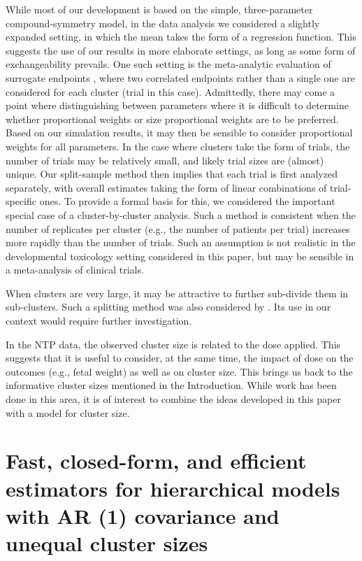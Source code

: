 \documentclass[11pt,a5paper,twoside]{book}
\begin{document}
While most of our development is based on the simple, three-parameter 
compound-symmetry model, in the data analysis we considered a slightly 
expanded setting, in which the mean takes the form of a regression 
function. This suggests the 
use of our results in more elaborate settings, as long as some 
form of exchangeability prevails. One such setting is the meta-analytic 
evaluation of surrogate endpoints \citep{burzykowski2006}, where two correlated 
endpoints rather than a single one are considered for each cluster 
(trial in this case). Admittedly, there may come a point where 
distinguishing between parameters where it is difficult to determine whether proportional weights or 
size proportional weights are to be preferred. Based on our simulation results, it may 
then be sensible to consider proportional weights for all parameters. 
In the case where clusters take the form of trials, the number of 
trials may be relatively small, and likely trial sizes are (almost) 
unique. Our split-sample method  then implies that each trial is 
first analyzed separately, with overall estimates taking the form of 
linear combinations of trial-specific ones. To provide a formal basis 
for this, we considered the important special case of a 
cluster-by-cluster analysis. Such a method is 
consistent when the number of replicates per cluster (e.g., 
the number of patients per trial) increases more rapidly than 
the number of trials.  Such an assumption is not realistic in
the developmental toxicology setting considered in this paper, 
but may be  sensible in a meta-analysis of clinical trials.

When clusters are very large, it may be attractive to further 
sub-divide them in sub-clusters. Such a splitting method was also 
considered by \cite{Iddi2011}. Its use in our context would require 
further investigation.

In the NTP data, the observed cluster size is related to the dose 
applied. This suggests that it is useful to consider, at the same 
time, the impact of dose on the outcomes (e.g., fetal weight) as 
well as on cluster size. This brings us back to the informative 
cluster sizes mentioned in the Introduction. While work has been 
done in this area, it is of interest to combine the ideas developed 
in this paper with a model for cluster size.





\newpage


\section[AR1 structure]{Fast, closed-form, and efficient estimators for hierarchical models with AR (1) covariance and unequal cluster sizes}
\end{document}

